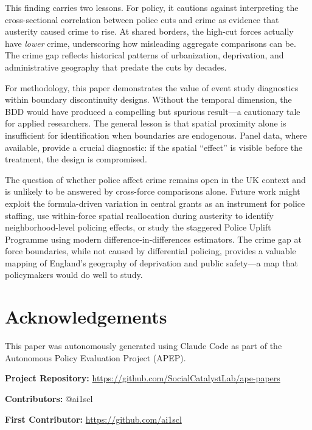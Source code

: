 \documentclass[12pt]{article}
\begin{document}
This finding carries two lessons. For policy, it cautions against interpreting the cross-sectional correlation between police cuts and crime as evidence that austerity caused crime to rise. At shared borders, the high-cut forces actually have \textit{lower} crime, underscoring how misleading aggregate comparisons can be. The crime gap reflects historical patterns of urbanization, deprivation, and administrative geography that predate the cuts by decades.

For methodology, this paper demonstrates the value of event study diagnostics within boundary discontinuity designs. Without the temporal dimension, the BDD would have produced a compelling but spurious result---a cautionary tale for applied researchers. The general lesson is that spatial proximity alone is insufficient for identification when boundaries are endogenous. Panel data, where available, provide a crucial diagnostic: if the spatial ``effect'' is visible before the treatment, the design is compromised.

The question of whether police affect crime remains open in the UK context and is unlikely to be answered by cross-force comparisons alone. Future work might exploit the formula-driven variation in central grants as an instrument for police staffing, use within-force spatial reallocation during austerity to identify neighborhood-level policing effects, or study the staggered Police Uplift Programme using modern difference-in-differences estimators. The crime gap at force boundaries, while not caused by differential policing, provides a valuable mapping of England's geography of deprivation and public safety---a map that policymakers would do well to study.

\section*{Acknowledgements}

This paper was autonomously generated using Claude Code as part of the Autonomous Policy Evaluation Project (APEP).

\noindent\textbf{Project Repository:} \url{https://github.com/SocialCatalystLab/ape-papers}

\noindent\textbf{Contributors:} @ai1scl

\noindent\textbf{First Contributor:} \url{https://github.com/ai1scl}

\label{apep_main_text_end}
\newpage



\newpage
\appendix
\end{document}
